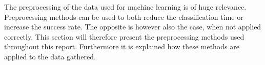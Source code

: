 The preprocessing of the data used for machine learning is of huge relevance.
Preprocessing methods can be used to both reduce the classification time or increase the success rate.
The opposite is however also the case, when not applied correctly.
This section will therefore present the preprocessing methods used throughout this report.
Furthermore it is explained how these methods are applied to the data gathered.